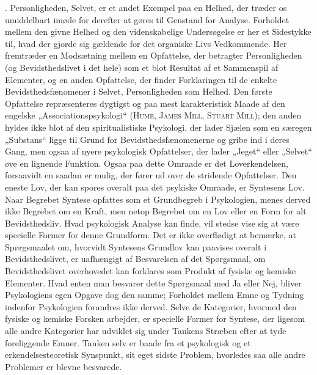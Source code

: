 \documentclass[12pt]{article}
\begin{document}
. Personligheden, Selvet, er et andet Exempel paa en Helhed, der træder os
umiddelbart imøde for derefter at gøres til Genstand for Analyse. Forholdet mellem
den givne Helhed og den videnskabelige Undersøgelse er her et Sidestykke til, hvad
der gjorde sig gældende for det organiske Livs Vedkommende. Her fremtræder en
Modsætning mellem en Opfattelse, der betragter Personligheden (og Bevidsthedslivet
i det hele) som et blot Resultat af et Sammenspil af Elementer, og en anden
Opfattelse, der finder Forklaringen til de enkelte Bevidsthedsfænomener i Selvet,
Personligheden som Helhed. Den første Opfattelse repræsenteres dygtigst og paa mest
karakteristisk Maade af den engelske „Associationspsykologi“ (\textsc{Hume}, \textsc{James Mill},
\textsc{Stuart Mill}); den anden hyldes ikke blot af den spiritualistiske Psykologi, der
lader Sjælen som en særegen „Substans“ ligge til Grund for Bevidsthedsfænomenerne
og gribe ind i deres Gang, men ogsaa af nyere psykologisk Opfattelser, der lader
„Jeget“ eller „Selvet“ øve en lignende Funktion. Ogsaa paa dette Omraade er det
Loverkendelsen, forsaavidt en saadan er mulig, der fører ud over de stridende
Opfattelser. Den eneste Lov, der kan spores overalt paa det psykiske Omraade, er
Syntesens Lov. Naar Begrebet Syntese opfattes som et Grundbegreb i Psykologien,
menes derved ikke Begrebet om en Kraft, men netop Begrebet om en Lov eller en
Form for alt Bevidsthedsliv. Hvad psykologisk Analyse kan finde, vil stedse vise
sig at være specielle Former for denne Grundform. Det er ikke overflødigt at
bemærke, at Spørgsmaalet om, hvorvidt Syntesens Grundlov kan paavises overalt i
Bevidsthedslivet, er uafhængigt af Besvarelsen af det Spørgsmaal, om
Bevidsthedslivet overhovedet kan forklares som Produkt af fysiske og kemiske Elementer.
Hvad enten man besvarer dette Spørgsmaal med Ja eller Nej, bliver Psykologiens
egen Opgave dog den samme; Forholdet mellem Emne og Tydning indenfor
Psykologien forandres ikke derved. Selve de Kategorier, hvormed den fysiske og kemiske
Forsken arbejder, er specielle Former for Syntese, der ligesom alle andre
Kategorier har udviklet sig under Tankens Stræben efter at tyde foreliggende Emner.
Tanken selv er baade fra et psykologisk og et erkendelsesteoretisk Synspunkt, sit
eget sidste Problem, hvorledes saa alle andre Problemer er blevne besvarede.
\end{document}
